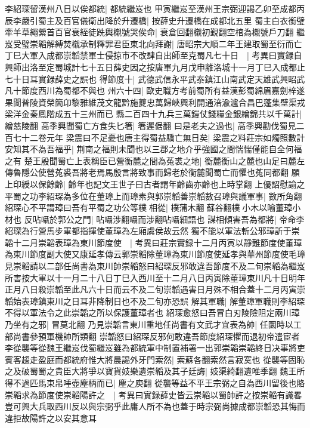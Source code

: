 李紹琛留漢州八日以俟都統|{
	都統繼岌也}
甲寅繼岌至漢州王宗弼迎謁乙卯至成都丙辰李嚴引蜀主及百官儀衛出降於升遷橋|{
	按薛史升遷橋在成都北五里}
蜀主白衣銜璧牽羊草繩縈首百官衰絰徒跣輿櫬號哭俟命|{
	衰倉回翻櫬初覲翻空棺為櫬號戶刀翻}
繼岌受璧崇韜解縛焚櫬承制釋罪君臣東北向拜謝|{
	唐昭宗大順二年王建取蜀至衍而亡}
丁巳大軍入成都崇韜禁軍士侵掠市不改肆自出師至克蜀凡七十日　|{
	考異曰實録自興師出洛至定蜀城計七十五日薛史因之按唐軍九月戊申離洛城十一月丁巳入成都止七十日耳實録薛史之誤也}
得節度十|{
	武德武信永平武泰鎮江山南武定天雄武興昭武凡十節度西川為蜀都不與也}
州六十四|{
	歐史職方考前蜀所有益漢彭蜀綿眉嘉劍梓遂果閬普陵資榮簡卬黎雅維茂文龍黔施夔忠萬歸峽興利開通涪渝瀘合昌巴蓬集壁渠戎梁洋金秦鳳階成五十三州而已}
縣二百四十九兵三萬鎧仗錢糧金銀繒錦共以千萬計|{
	繒慈陵翻}
高季興聞蜀亡方食失匕箸|{
	箸遲倨翻}
曰是老夫之過也|{
	高季興勸伐蜀見二百七十二卷元年}
梁震曰不足憂也唐主得蜀益驕亡無日矣|{
	梁震之料莊宗如燭照數計}
安知其不為吾福乎|{
	荆南之福則未聞也以三郡之地介乎強國之間惴惴僅能自全何福之有}
楚王殷聞蜀亡上表稱臣已營衡麓之間為菟裘之地|{
	衡麓衡山之麓也山足曰麓左傳魯隱公使營菟裘吾將老焉馬殷言將致事而歸老於衡麓聞蜀亡而懼也菟同都翻}
願上印綬以保餘齡|{
	齡年也記文王世子曰古者謂年齡齒亦齡也上時掌翻}
上優詔慰諭之　平蜀之功李紹琛為多位在董璋上而璋素與郭崇韜善崇韜數召璋與議軍事|{
	數所角翻}
紹琛心不平謂璋曰吾有平蜀之功公等樸相從|{
	樸蒲木翻蘇谷翻樸小木以喻董璋小材也}
反呫囁於郭公之門|{
	呫囁涉翻囁而涉翻呫囁細語也}
謀相傾害吾為都將|{
	帝命李紹琛為行營馬步軍都指揮使董璋為左廂虞侯故云然}
獨不能以軍法斬公邪璋訢于崇韜十二月崇韜表璋為東川節度使　|{
	考異曰莊宗實録十二月丙寅以靜難節度使董璋為東川節度副大使又康延孝傳云郭崇韜除董璋為東川節度使延孝與華州節度使毛璋見崇韜請以二部任尚書為東川帥崇韜怒曰紹琛反邪敢違吾節度不及二旬崇韜為繼岌所害按大軍以十一月二十八日丁巳入西川至十二月八日丙寅除董璋東川凡十日明年正月八日殺崇韜至此凡六十日而云不及二旬崇韜遇害日月殊不相合蓋十二月丙寅崇韜始表璋鎮東川之日耳非降制日也不及二旬亦恐誤}
解其軍職|{
	解董璋軍職則李紹琛不得以軍法令之此崇韜之所以保護董璋者也}
紹琛愈怒曰吾冒白刃陵險阻定兩川璋乃坐有之邪|{
	冒莫北翻}
乃見崇韜言東川重地任尚書有文武才宜表為帥|{
	任圜時以工部尚書參預軍機帥所類翻}
崇韜怒曰紹琛反邪何敢違吾節度紹琛懼而退初帝遣宦者李從襲等從魏王繼岌伐蜀繼岌雖為都統軍中制置補署一出郭崇韜崇韜終日决事將吏賓客趨走盈庭而都統府惟大將晨謁外牙門索然|{
	索蘇各翻索然言寂寞也}
從襲等固恥之及破蜀蜀之貴臣大將爭以寶貨妓樂遺崇韜及其子廷誨|{
	妓渠綺翻遺唯季翻}
魏王所得不過匹馬束帛唾壺塵柄而已|{
	塵之庾翻}
從襲等益不平王宗弼之自為西川留後也賂崇韜求為節度使崇韜陽許之　|{
	考異曰實録薛史皆云崇韜以蜀帥許之按崇韜有識畧豈可興大兵取西川反以與宗弼乎此庸人所不為也蓋于時宗弼尚據成都崇韜恐其悔而違拒故陽許之以安其意耳}
